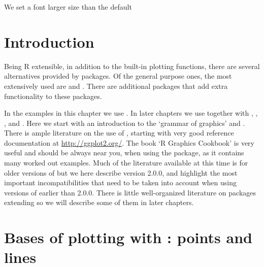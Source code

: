 \documentclass[paper=a4,headsepline,BCOR=12mm,twoside,open=right,%
titlepage,headings=small,fontsize=10pt,index=totoc,bibliography=totoc,%
captions=tableheading,captions=nooneline]{scrbook}\usepackage{knitr}
\begin{document}
\begin{knitrout}\footnotesize
{}\color{fgcolor}\begin{kframe}
\begin{alltt}
\end{alltt}
\end{kframe}
\end{knitrout}

We set a font larger size than the default
\begin{knitrout}\footnotesize
{}\color{fgcolor}\begin{kframe}
\begin{alltt}
\hlstd{(}\hlstd{(}\hlstd{))}
\end{alltt}
\end{kframe}
\end{knitrout}




\section{Introduction}

Being R extensible, in addition to the built-in plotting functions, there are several alternatives provided by packages. Of the general purpose ones, the most extensively used are  and \ggplot. There are additional packages that add extra functionality to these packages.

In the examples in this chapter we use \ggplot. In later chapters we use \ggplot together with \ggmap, \ggtern, \ggrepel, and \ggpmisc. Here we start with an introduction to the `grammar of graphics' and \ggplot. There is ample literature on the use of \ggplot, starting with very good reference documentation at \url{http://ggplot2.org/}. The book `R Graphics Cookbook' \autocite{Chang2013} is very useful and should be always near you, when using the package, as it contains many worked out examples. Much of the literature available at this time is for older versions of \ggplot but we here describe version 2.0.0, and highlight the most important incompatibilities that need to be taken into account when using versions of \ggplot earlier than 2.0.0. There is little well-organized literature on packages extending \ggplot so we will describe some of them in later chapters.

\section{Bases of plotting with \ggplot: points and lines}
\end{document}
